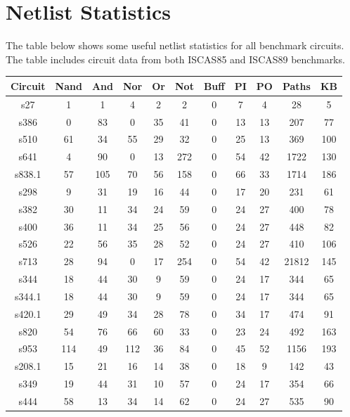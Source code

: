 \documentclass[a4paper,12pt]{article}
\begin{document}
\section*{Netlist Statistics}

The table below shows some useful netlist statistics for all benchmark circuits. The table includes circuit data from both ISCAS85 and ISCAS89 benchmarks.


\begin{center}
\begin{tabular}{||c c c c c c c c c c c||}
\hline
Circuit & Nand & And & Nor & Or& Not & Buff & PI & PO & Paths & KB \\ [0.5ex] 
\hline\hline
s27 & 1 & 1 & 4 & 2 & 2 & 0 & 7 & 4 & 28 & 5 \\ 
\hline
s386 & 0 & 83 & 0 & 35 & 41 & 0 & 13 & 13 & 207 & 77 \\ 
\hline
s510 & 61 & 34 & 55 & 29 & 32 & 0 & 25 & 13 & 369 & 100 \\ 
\hline
s641 & 4 & 90 & 0 & 13 & 272 & 0 & 54 & 42 & 1722 & 130 \\ 
\hline
s838.1 & 57 & 105 & 70 & 56 & 158 & 0 & 66 & 33 & 1714 & 186 \\ 
\hline
s298 & 9 & 31 & 19 & 16 & 44 & 0 & 17 & 20 & 231 & 61 \\ 
\hline
s382 & 30 & 11 & 34 & 24 & 59 & 0 & 24 & 27 & 400 & 78 \\ 
\hline
s400 & 36 & 11 & 34 & 25 & 56 & 0 & 24 & 27 & 448 & 82 \\ 
\hline
s526 & 22 & 56 & 35 & 28 & 52 & 0 & 24 & 27 & 410 & 106 \\ 
\hline
s713 & 28 & 94 & 0 & 17 & 254 & 0 & 54 & 42 & 21812 & 145 \\ 
\hline
s344 & 18 & 44 & 30 & 9 & 59 & 0 & 24 & 17 & 344 & 65 \\ 
\hline
s344.1 & 18 & 44 & 30 & 9 & 59 & 0 & 24 & 17 & 344 & 65 \\ 
\hline
s420.1 & 29 & 49 & 34 & 28 & 78 & 0 & 34 & 17 & 474 & 91 \\ 
\hline
s820 & 54 & 76 & 66 & 60 & 33 & 0 & 23 & 24 & 492 & 163 \\ 
\hline
s953 & 114 & 49 & 112 & 36 & 84 & 0 & 45 & 52 & 1156 & 193 \\ 
\hline
s208.1 & 15 & 21 & 16 & 14 & 38 & 0 & 18 & 9 & 142 & 43 \\ 
\hline
s349 & 19 & 44 & 31 & 10 & 57 & 0 & 24 & 17 & 354 & 66 \\ 
\hline
s444 & 58 & 13 & 34 & 14 & 62 & 0 & 24 & 27 & 535 & 90 \\ 

\end{tabular}
\end{center}
\end{document}
